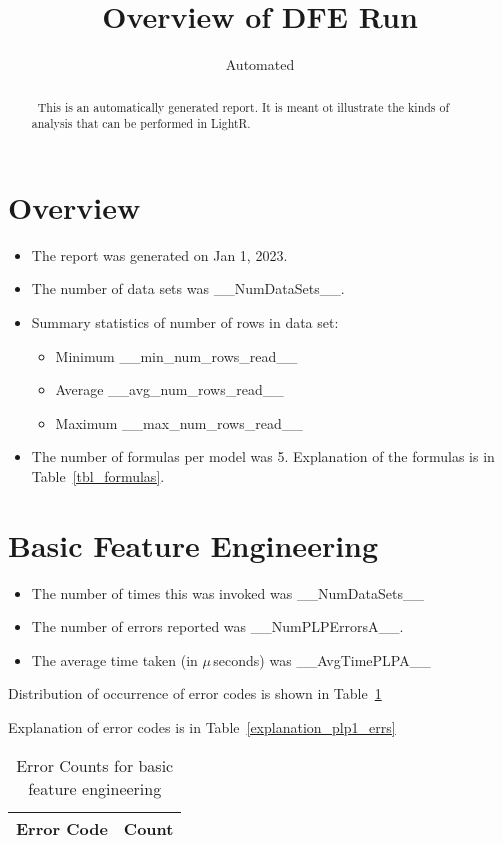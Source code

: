 \documentclass[letterpaper,12pt]{article}
\newcommand{\bi}{\begin{itemize}}
\newcommand{\ei}{\end{itemize}}
\newcommand{\ReportDate}{Jan 1, 2023}
\newcommand{\NumDataSets}{__NumDataSets__}
\newcommand{\NumFormulas}{5}
\newcommand{\MinNumRows}{__min_num_rows_read__}
\newcommand{\MaxNumRows}{__max_num_rows_read__}
\newcommand{\AvgNumRows}{__avg_num_rows_read__}
\newcommand{\NumPLPErrorsA}{__NumPLPErrorsA__}
\newcommand{\AvgTimePLPA}{__AvgTimePLPA__}
\begin{document}
\title{Overview of DFE Run}
\author{Automated}
\maketitle
\thispagestyle{fancy}
\lhead{}
\chead{}
\rhead{}
\cfoot{}
\rfoot{{\small \thepage}}

\begin{abstract}
\ This is an automatically generated report. It is meant ot illustrate the kinds
of analysis that can be performed in LightR.
\end{abstract}

\section{Overview}

\bi
\item The report was generated on \ReportDate. 
\item The number of data sets was \NumDataSets.
\item Summary statistics of number of rows in data set:
  \bi
\item Minimum \MinNumRows
\item Average \AvgNumRows
\item Maximum \MaxNumRows
  \ei
\item The number of formulas per model was \NumFormulas.
  Explanation of the formulas is in Table~\ref{tbl_formulas}.
  \ei

\section{Basic Feature Engineering}
\label{PLP1}
\bi
\item The number of times this was invoked was \NumDataSets
\item The number of errors reported was \NumPLPErrorsA.
\item The average time taken (in \(\mu\,\)seconds) was \AvgTimePLPA
\ei

Distribution of occurrence of error codes is shown in Table~\ref{plp1_errs}

Explanation of error codes is in Table~\ref{explanation_plp1_errs}
\begin{table}
  \centering
  \begin{tabular}{|l|l|} \hline \hline
    {\bf Error Code} & {\bf Count} \\ \hline 
     
    \hline
  \end{tabular}
  \caption{Error Counts for basic feature engineering}
  \label{plp1_errs}
\end{table}
\end{document}
